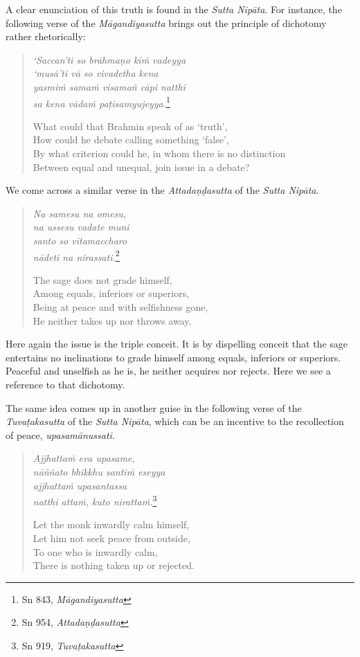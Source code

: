 A clear enunciation of this truth is found in the \emph{Sutta Nipāta}. For instance, the following verse of the \emph{Māgandiyasutta} brings out the principle of dichotomy rather rhetorically:

\begin{quote}
\emph{`Saccan'ti so brāhmaṇo kiṁ vadeyya}\\
\emph{`musā'ti vā so vivadetha kena}\\
\emph{yasmiṁ samaṁ visamañ cāpi natthi}\\
\emph{sa kena vādaṁ paṭisamyujeyya.}\footnote{Sn 843, \emph{Māgandiyasutta}}

What could that Brahmin speak of as `truth',\\
How could he debate calling something `false',\\
By what criterion could he, in whom there is no distinction\\
Between equal and unequal, join issue in a debate?
\end{quote}

We come across a similar verse in the \emph{Attadaṇḍasutta} of the \emph{Sutta Nipāta}.

\begin{quote}
\emph{Na samesu na omesu,}\\
\emph{na ussesu vadate muni}\\
\emph{santo so vītamaccharo}\\
\emph{nādeti na nirassati.}\footnote{Sn 954, \emph{Attadaṇḍasutta}}

The sage does not grade himself,\\
Among equals, inferiors or superiors,\\
Being at peace and with selfishness gone,\\
He neither takes up nor throws away.
\end{quote}

Here again the issue is the triple conceit. It is by dispelling conceit that the sage entertains no inclinations to grade himself among equals, inferiors or superiors. Peaceful and unselfish as he is, he neither acquires nor rejects. Here we see a reference to that dichotomy.

The same idea comes up in another guise in the following verse of the \emph{Tuvaṭakasutta} of the \emph{Sutta Nipāta}, which can be an incentive to the recollection of peace, \emph{upasamānussati}.

\clearpage

\begin{quote}
\emph{Ajjhattaṁ eva upasame,}\\
\emph{nāññato bhikkhu santiṁ eseyya}\\
\emph{ajjhattaṁ upasantassa}\\
\emph{natthi attaṁ, kuto nirattaṁ.}\footnote{Sn 919, \emph{Tuvaṭakasutta}}

Let the monk inwardly calm himself,\\
Let him not seek peace from outside,\\
To one who is inwardly calm,\\
There is nothing taken up or rejected.
\end{quote}

